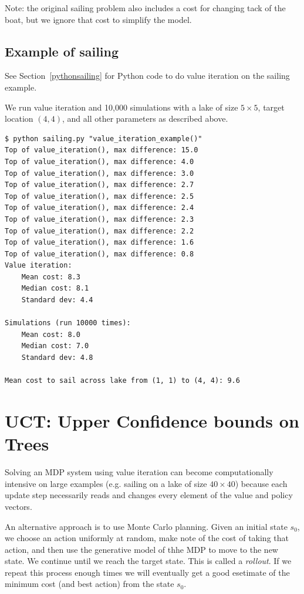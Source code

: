 \documentclass[10pt,amstags,fleqn]{article}
\theoremstyle{plain}
\theoremstyle{definition}
\theoremstyle{definition}
\begin{document}
Note: the original sailing problem also includes a cost for changing
tack of the boat, but we ignore that cost to simplify the model.

\subsection{Example of sailing}

See Section~\ref{pythonsailing} for Python code to do value iteration on
the sailing example.

We run value iteration and 10,000 simulations with a lake of size $5
\times 5$, target location $(4,4)$, and all other parameters as
described above.

\begin{Verbatim}
$ python sailing.py "value_iteration_example()"
Top of value_iteration(), max difference: 15.0
Top of value_iteration(), max difference: 4.0
Top of value_iteration(), max difference: 3.0
Top of value_iteration(), max difference: 2.7
Top of value_iteration(), max difference: 2.5
Top of value_iteration(), max difference: 2.4
Top of value_iteration(), max difference: 2.3
Top of value_iteration(), max difference: 2.2
Top of value_iteration(), max difference: 1.6
Top of value_iteration(), max difference: 0.8
Value iteration:
    Mean cost: 8.3
    Median cost: 8.1
    Standard dev: 4.4

Simulations (run 10000 times):
    Mean cost: 8.0
    Median cost: 7.0
    Standard dev: 4.8

Mean cost to sail across lake from (1, 1) to (4, 4): 9.6
\end{Verbatim}

\section{UCT: Upper Confidence bounds on Trees}

Solving an MDP system using value iteration can become computationally
intensive on large examples (e.g. sailing on a lake of size $40 \times
40$) because each update step necessarily reads and changes every
element of the value and policy vectors.

An alternative approach is to use Monte Carlo planning. Given an initial
state $s_0$, we choose an action uniformly at random, make note of the
cost of taking that action, and then use the generative model of thhe
MDP to move to the new state. We continue until we reach the target
state. This is called a {\em rollout}.
If we repeat this process enough times we will eventually get a
good esetimate of the minimum cost (and best action) from the state
$s_0$.
\end{document}
